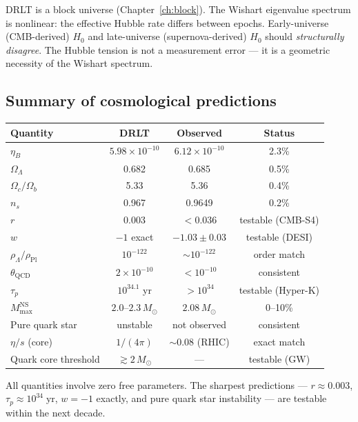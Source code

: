 DRLT is a block universe (Chapter~\ref{ch:block}). The Wishart eigenvalue spectrum is nonlinear: the effective Hubble rate differs between epochs. Early-universe (CMB-derived) $H_0$ and late-universe (supernova-derived) $H_0$ should \emph{structurally disagree}. The Hubble tension is not a measurement error --- it is a geometric necessity of the Wishart spectrum.

\subsection{Summary of cosmological predictions}

\begin{center}
\begin{tabular}{lccc}
\hline
Quantity & DRLT & Observed & Status \\
\hline
$\eta_B$ & $5.98 \times 10^{-10}$ & $6.12 \times 10^{-10}$ & 2.3\% \\
$\Omega_\Lambda$ & 0.682 & 0.685 & 0.5\% \\
$\Omega_c/\Omega_b$ & 5.33 & 5.36 & 0.4\% \\
$n_s$ & 0.967 & 0.9649 & 0.2\% \\
$r$ & 0.003 & $< 0.036$ & testable (CMB-S4) \\
$w$ & $-1$ exact & $-1.03 \pm 0.03$ & testable (DESI) \\
$\rho_\Lambda/\rho_\text{Pl}$ & $10^{-122}$ & $\sim 10^{-122}$ & order match \\
$\theta_\text{QCD}$ & $2 \times 10^{-10}$ & $< 10^{-10}$ & consistent \\
$\tau_p$ & $10^{34.1}$ yr & $> 10^{34}$ & testable (Hyper-K) \\
$M_\text{max}^\text{NS}$ & $2.0$--$2.3\,M_\odot$ & $2.08\,M_\odot$ & 0--10\% \\
Pure quark star & unstable & not observed & consistent \\
$\eta/s$ (core) & $1/(4\pi)$ & $\sim 0.08$ (RHIC) & exact match \\
Quark core threshold & $\gtrsim 2\,M_\odot$ & --- & testable (GW) \\
\hline
\end{tabular}
\end{center}

All quantities involve zero free parameters. The sharpest predictions --- $r \approx 0.003$, $\tau_p \approx 10^{34}\;\text{yr}$, $w = -1$ exactly, and pure quark star instability --- are testable within the next decade.
